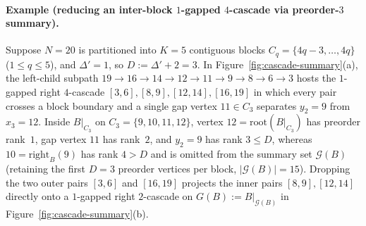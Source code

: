 \documentclass[11pt]{article}
\theoremstyle{definition}
\theoremstyle{remark}
\begin{document}
\paragraph{Example (reducing an inter-block $1$-gapped $4$-cascade via preorder-$3$ summary).}
Suppose $N = 20$ is partitioned into $K = 5$ contiguous blocks $C_q = \{4q - 3, \dots, 4q\}$ ($1 \le q \le 5$), and $\Delta' = 1$, so $D := \Delta' + 2 = 3$. In Figure~\ref{fig:cascade-summary}(a), the left-child subpath $19 \to 16 \to 14 \to 12 \to 11 \to 9 \to 8 \to 6 \to 3$ hosts the $1$-gapped right $4$-cascade $[3, 6], [8, 9], [12, 14], [16, 19]$ in which every pair crosses a block boundary and a single gap vertex $11 \in C_3$ separates $y_2 = 9$ from $x_3 = 12$. Inside $B|_{C_3}$ on $C_3 = \{9, 10, 11, 12\}$, vertex $12 = \mathrm{root}(B|_{C_3})$ has preorder rank~$1$, gap vertex $11$ has rank~$2$, and $y_2 = 9$ has rank $3 \le D$, whereas $10 = \mathrm{right}_B(9)$ has rank $4 > D$ and is omitted from the summary set $\mathcal{G}(B)$ (retaining the first $D = 3$ preorder vertices per block, $|\mathcal{G}(B)| = 15$). Dropping the two outer pairs $[3, 6]$ and $[16, 19]$ projects the inner pairs $[8, 9], [12, 14]$ directly onto a $1$-gapped right $2$-cascade on $G(B) := B|_{\mathcal{G}(B)}$ in Figure~\ref{fig:cascade-summary}(b).
\end{document}
